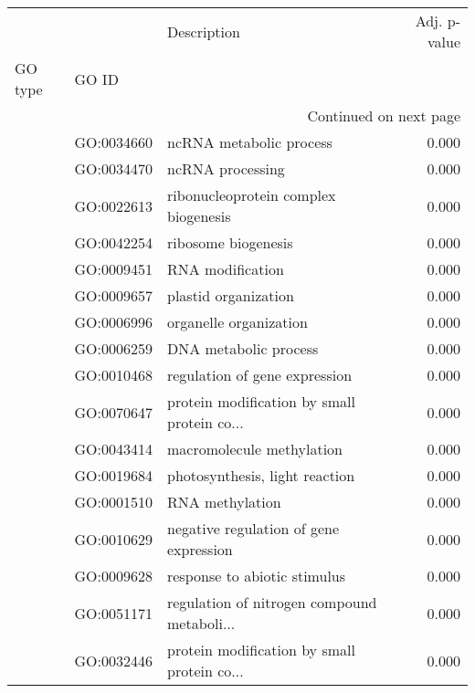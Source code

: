 \begin{longtable}{lllr}
\toprule
   &            &                                  Description &  Adj. p-value \\
GO type & GO ID &                                              &               \\
\midrule
\endhead
\midrule
\multicolumn{4}{r}{{Continued on next page}} \\
\midrule
\endfoot

\bottomrule
\endlastfoot
\multirow{262}{*}{BP} & GO:0034660 &                      ncRNA metabolic process &         0.000 \\
   & GO:0034470 &                             ncRNA processing &         0.000 \\
   & GO:0022613 &         ribonucleoprotein complex biogenesis &         0.000 \\
   & GO:0042254 &                          ribosome biogenesis &         0.000 \\
   & GO:0009451 &                             RNA modification &         0.000 \\
   & GO:0009657 &                         plastid organization &         0.000 \\
   & GO:0006996 &                       organelle organization &         0.000 \\
   & GO:0006259 &                        DNA metabolic process &         0.000 \\
   & GO:0010468 &                regulation of gene expression &         0.000 \\
   & GO:0070647 &  protein modification by small protein co... &         0.000 \\
   & GO:0043414 &                    macromolecule methylation &         0.000 \\
   & GO:0019684 &               photosynthesis, light reaction &         0.000 \\
   & GO:0001510 &                              RNA methylation &         0.000 \\
   & GO:0010629 &       negative regulation of gene expression &         0.000 \\
   & GO:0009628 &                 response to abiotic stimulus &         0.000 \\
   & GO:0051171 &  regulation of nitrogen compound metaboli... &         0.000 \\
   & GO:0032446 &  protein modification by small protein co... &         0.000 \\

\end{longtable}
